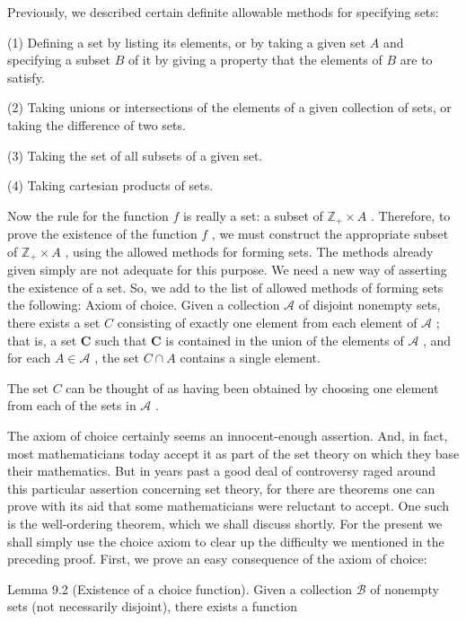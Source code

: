 Previously, we described certain definite allowable methods for specifying sets:

(1) Defining a set by listing its elements, or by taking a given set \(A\) and specifying a subset \(B\) of it by giving a property that the elements of \(B\) are to satisfy.

(2) Taking unions or intersections of the elements of a given collection of sets, or taking the difference of two sets.

(3) Taking the set of all subsets of a given set.

(4) Taking cartesian products of sets.

Now the rule for the function \(f\) is really a set: a subset of \({\mathbb{Z}}_{ + } \times  A\) . Therefore, to prove the existence of the function \(f\) , we must construct the appropriate subset of \({\mathbb{Z}}_{ + } \times  A\) , using the allowed methods for forming sets. The methods already given simply are not adequate for this purpose. We need a new way of asserting the existence of a set. So, we add to the list of allowed methods of forming sets the following: Axiom of choice. Given a collection \(\mathcal{A}\) of disjoint nonempty sets, there exists a set \(C\) consisting of exactly one element from each element of \(\mathcal{A}\) ; that is, a set \(\mathbf{C}\) such that \(\mathbf{C}\) is contained in the union of the elements of \(\mathcal{A}\) , and for each \(A \in  \mathcal{A}\) , the set \(C \cap  A\) contains a single element.

The set \(C\) can be thought of as having been obtained by choosing one element from each of the sets in \(\mathcal{A}\) .

The axiom of choice certainly seems an innocent-enough assertion. And, in fact, most mathematicians today accept it as part of the set theory on which they base their mathematics. But in years past a good deal of controversy raged around this particular assertion concerning set theory, for there are theorems one can prove with its aid that some mathematicians were reluctant to accept. One such is the well-ordering theorem, which we shall discuss shortly. For the present we shall simply use the choice axiom to clear up the difficulty we mentioned in the preceding proof. First, we prove an easy consequence of the axiom of choice:

Lemma 9.2 (Existence of a choice function). Given a collection \(\mathcal{B}\) of nonempty sets (not necessarily disjoint), there exists a function

